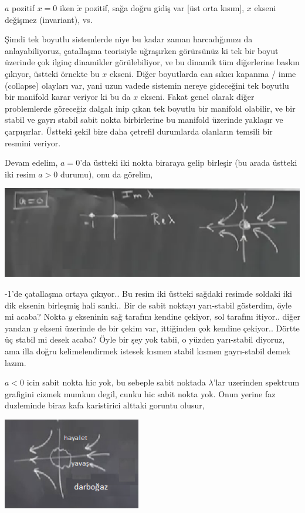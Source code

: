 \documentclass[12pt,fleqn]{article}\usepackage{../../common}
\begin{document}
$a$ pozitif $x=0$ iken $\dot{x}$ pozitif, sağa doğru gidiş var [üst orta kısım],
$x$ ekseni değişmez (invariant), vs.

Şimdi tek boyutlu sistemlerde niye bu kadar zaman harcadığımızı da
anlayabiliyoruz, çatallaşma teorisiyle uğraşırken görürsünüz ki tek bir boyut
üzerinde çok ilginç dinamikler görülebiliyor, ve bu dinamik tüm diğerlerine
baskın çıkıyor, üstteki örnekte bu $x$ ekseni. Diğer boyutlarda can sıkıcı
kapanma / inme (collapse) olayları var, yani uzun vadede sistemin nereye
gideceğini tek boyutlu bir manifold karar veriyor ki bu da $x$ ekseni.  Fakat
genel olarak diğer problemlerde göreceğiz dalgalı inip çıkan tek boyutlu bir
manifold olabilir, ve bir stabil ve gayrı stabil sabit nokta birbirlerine bu
manifold üzerinde yaklaşır ve çarpışırlar. Üstteki şekil bize daha çetrefil
durumlarda olanların temsili bir resmini veriyor.

Devam edelim, $a=0$'da üstteki iki nokta biraraya gelip birleşir (bu arada
üstteki iki resim $a>0$ durumu),  onu da görelim,

\includegraphics[height=4cm]{12_14.png}

-1'de çatallaşma ortaya çıkıyor.. Bu resim iki üstteki sağdaki resimde soldaki
iki dik eksenin birleşmiş hali sanki.. Bir de sabit noktayı yarı-stabil
gösterdim, öyle mi acaba? Nokta $y$ ekseninin sağ tarafını kendine çekiyor, sol
tarafını itiyor.. diğer yandan $y$ ekseni üzerinde de bir çekim var, ittiğinden
çok kendine çekiyor.. Dörtte üç stabil mi desek acaba? Öyle bir şey yok tabii, o
yüzden yarı-stabil diyoruz, ama illa doğru kelimelendirmek istesek kısmen stabil
kısmen gayrı-stabil demek lazım.

$a<0$ icin sabit nokta hic yok, bu sebeple sabit noktada $\lambda$'lar uzerinden
spektrum grafigini cizmek mumkun degil, cunku hic sabit nokta yok. Onun yerine
faz duzleminde biraz kafa karistirici alttaki goruntu olusur,

\includegraphics[height=4cm]{12_15.png}
\end{document}
